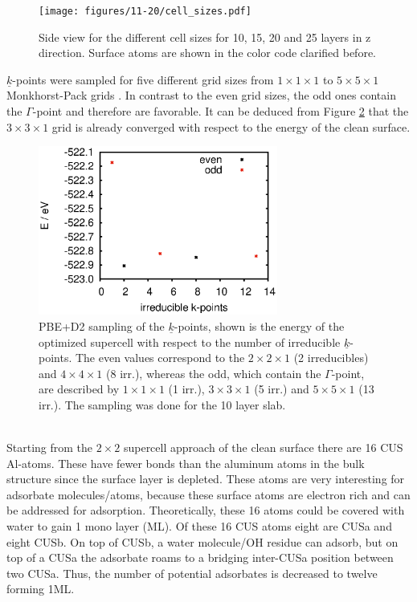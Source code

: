 \documentclass[11pt,DIV=13,BCOR=5mm,a4paper,headinclude]{scrbook}
\renewcommand{\vec}[1]{\underline{#1}}
\begin{document}
\begin{figure}[!h]
    \centering
    \texttt{[image: figures/11-20/cell\_sizes.pdf]}
             \caption{Side view for the different cell sizes for 10, 15, 20 and 25 layers in z direction.
Surface atoms are shown in the color code clarified before.}
            \label{abb:cell_sizes}
\end{figure}
$\vec{k}$-points were sampled for five different grid sizes from $1\times 1\times 1$ to $5\times 5\times 1$ Monkhorst-Pack grids \cite{monkhorst}.
In contrast to the even grid sizes, the odd ones contain the $\Gamma$-point and therefore are favorable.
It can be deduced from Figure \ref{abb:11-20-kpointsampling} that the $3\times 3\times 1$ grid is already converged with respect to the energy of the clean surface.
\begin{figure}[!h]
\centering
 \includegraphics[width=0.7\textwidth]{figures/11-20/irreducibles-E.eps}
   \caption{PBE+D2 sampling of the $\vec{k}$-points, shown is the energy of the optimized supercell with respect to the number of irreducible $\vec{k}$-points.
The even values correspond to the $2\times 2 \times 1$ (2 irreducibles) and $4\times 4\times 1$ (8 irr.), whereas the odd, which contain the $\Gamma$-point, are described by $1\times 1\times 1$ (1 irr.), $3\times 3\times 1$ (5 irr.) and $5\times 5\times 1$ (13 irr.).
The sampling was done for the 10 layer slab.}
            \label{abb:11-20-kpointsampling}
\end{figure}
\\

Starting from the $2\times 2$ supercell approach of the clean surface there are 16 CUS Al-atoms.
These have fewer bonds than the aluminum atoms in the bulk structure since the surface layer is  depleted.
These atoms are very interesting for adsorbate molecules/atoms, because these surface atoms are electron rich and can be addressed for adsorption.
Theoretically, these 16 atoms could be covered with water to gain 1 mono layer (ML).
Of these 16 CUS atoms eight are CUSa and eight CUSb.
On top of CUSb, a water molecule/OH residue can adsorb, but on top of a CUSa the adsorbate roams to a bridging inter-CUSa position between two CUSa.
Thus, the number of potential adsorbates is decreased to twelve forming 1ML.
\end{document}
